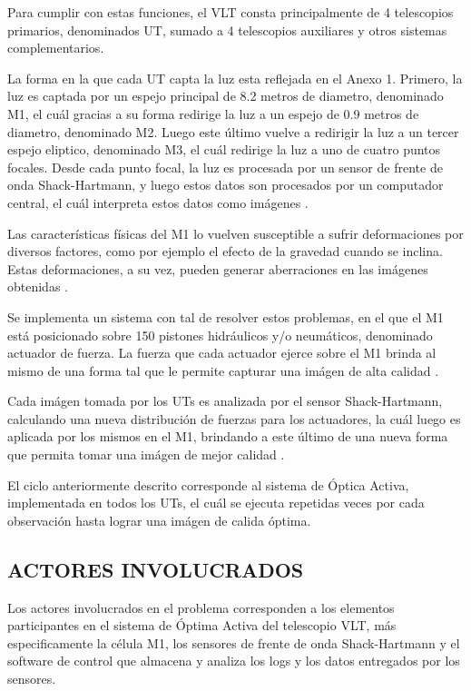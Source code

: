 Para cumplir con estas funciones, el VLT consta principalmente de 4 telescopios primarios, denominados UT, sumado a 4 telescopios auxiliares y otros sistemas complementarios\cite{eso1998vlt}.

La forma en la que cada UT capta la luz esta reflejada en el Anexo 1. Primero, la luz es captada por un espejo principal de 8.2 metros de diametro, denominado M1, el cuál gracias a su forma redirige la luz a un espejo de 0.9 metros de diametro, denominado M2. Luego este último vuelve a redirigir la luz a un tercer espejo eliptico, denominado M3, el cuál redirige la luz a uno de cuatro puntos focales. Desde cada punto focal, la luz es procesada por un sensor de frente de onda Shack-Hartmann, y luego estos datos son procesados por un computador central, el cuál interpreta estos datos como imágenes \cite{eso1998vlt}.

Las características físicas del M1 lo vuelven susceptible a sufrir deformaciones por diversos factores, como por ejemplo el efecto de la gravedad cuando se inclina. Estas deformaciones, a su vez, pueden generar aberraciones en las imágenes obtenidas \cite{wilson1987active}.

Se implementa un sistema con tal de resolver estos problemas, en el que el M1 está posicionado sobre 150 pistones hidráulicos y/o neumáticos, denominado actuador de fuerza. La fuerza que cada actuador ejerce sobre el M1 brinda al mismo de una forma tal que le permite capturar una imágen de alta calidad \cite{eso1998vlt}. 

Cada imágen tomada por los UTs es analizada por el sensor Shack-Hartmann, calculando una nueva distribución de fuerzas para los actuadores, la cuál luego es aplicada por los mismos en el M1, brindando a este último de una nueva forma que permita tomar una imágen de mejor calidad \cite{eso1998vlt}. 

El ciclo anteriormente descrito corresponde al sistema de Óptica Activa, implementada en todos los UTs, el cuál se ejecuta repetidas veces por cada observación hasta lograr una imágen de calida óptima\cite{eso1998vlt}.

\subsection{ACTORES INVOLUCRADOS}

Los actores involucrados en el problema corresponden a los elementos participantes en el sistema de Óptima Activa del telescopio VLT, más especificamente la célula M1, los sensores de frente de onda Shack-Hartmann y el software de control que almacena y analiza los logs y los datos entregados por los sensores\cite{eso2011vlt}.

